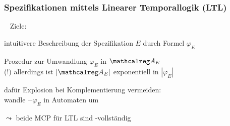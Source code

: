     \begin{frame}
      \frametitle{Spezifikationen mittels Linearer Temporallogik (LTL)}

      ~ Ziele:
      \begin{Itemize}
        \item
          intuitivere Beschreibung der Spezifikation $E$ durch Formel $\varphi_E$
          \par\smallskip
        \item
          Prozedur zur Umwandlung $\varphi_E$ in $\Aut{A}_E$\\
          (!) allerdings ist $|\Aut{A}_E|$ exponentiell in $|\varphi_E|$
          \par\smallskip
        \item
          dafür Explosion bei Komplementierung vermeiden:\\
          wandle $\lnot\varphi_E$ in Automaten um
          \par\smallskip
        \item[$\leadsto$]
          beide MCP für LTL sind \PSPACE-vollständig
      \end{Itemize}

    \end{frame}

